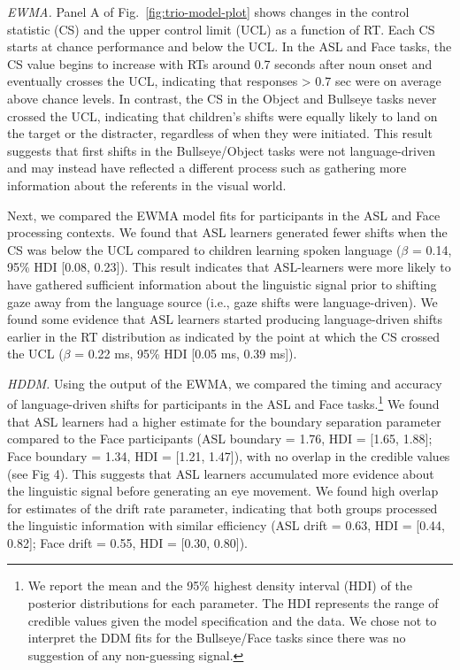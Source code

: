 \documentclass[english,floatsintext,man]{apa6}
\begin{document}
\emph{EWMA.} Panel A of Fig.~\ref{fig:trio-model-plot} shows changes in
the control statistic (CS) and the upper control limit (UCL) as a
function of RT. Each CS starts at chance performance and below the UCL.
In the ASL and Face tasks, the CS value begins to increase with RTs
around 0.7 seconds after noun onset and eventually crosses the UCL,
indicating that responses \textgreater{} 0.7 sec were on average above
chance levels. In contrast, the CS in the Object and Bullseye tasks
never crossed the UCL, indicating that children's shifts were equally
likely to land on the target or the distracter, regardless of when they
were initiated. This result suggests that first shifts in the
Bullseye/Object tasks were not language-driven and may instead have
reflected a different process such as gathering more information about
the referents in the visual world.

Next, we compared the EWMA model fits for participants in the ASL and
Face processing contexts. We found that ASL learners generated fewer
shifts when the CS was below the UCL compared to children learning
spoken language (\(\beta\) = 0.14, 95\% HDI {[}0.08, 0.23{]}). This
result indicates that ASL-learners were more likely to have gathered
sufficient information about the linguistic signal prior to shifting
gaze away from the language source (i.e., gaze shifts were
language-driven). We found some evidence that ASL learners started
producing language-driven shifts earlier in the RT distribution as
indicated by the point at which the CS crossed the UCL (\(\beta\) = 0.22
ms, 95\% HDI {[}0.05 ms, 0.39 ms{]}).

\emph{HDDM.} Using the output of the EWMA, we compared the timing and
accuracy of language-driven shifts for participants in the ASL and Face
tasks.\footnote{We report the mean and the 95\% highest density interval
  (HDI) of the posterior distributions for each parameter. The HDI
  represents the range of credible values given the model specification
  and the data. We chose not to interpret the DDM fits for the
  Bullseye/Face tasks since there was no suggestion of any non-guessing
  signal.} We found that ASL learners had a higher estimate for the
boundary separation parameter compared to the Face participants (ASL
boundary = 1.76, HDI = {[}1.65, 1.88{]}; Face boundary = 1.34, HDI =
{[}1.21, 1.47{]}), with no overlap in the credible values (see Fig 4).
This suggests that ASL learners accumulated more evidence about the
linguistic signal before generating an eye movement. We found high
overlap for estimates of the drift rate parameter, indicating that both
groups processed the linguistic information with similar efficiency (ASL
drift = 0.63, HDI = {[}0.44, 0.82{]}; Face drift = 0.55, HDI = {[}0.30,
0.80{]}).
\end{document}
